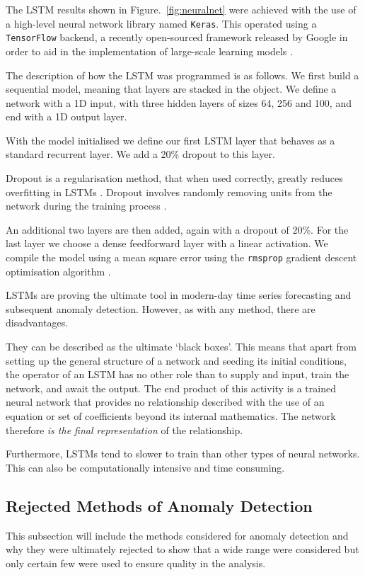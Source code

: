 The LSTM results shown in Figure.~\ref{fig:neuralnet} were achieved with the use of a high-level neural network library named \texttt{Keras}. This operated using a \texttt{TensorFlow} backend, a recently open-sourced framework released by Google in order to aid in the implementation of large-scale learning models \cite{Abadi:2016:TSL:3026877.3026899}.

The description of how the LSTM was programmed is as follows. We first build a sequential model, meaning that layers are stacked in the object.  We define a network with a 1D input, with three hidden layers of sizes 64, 256 and 100, and end with a 1D output layer.

With the model initialised we define our first LSTM layer that behaves as a standard recurrent layer. We add a 20\% dropout to this layer. 

Dropout is a regularisation method, that when used correctly, greatly reduces overfitting in LSTMs \cite{2014arXiv1409.2329Z}. Dropout involves randomly removing units from the network during the training process \cite{2013arXiv1311.0701B}.

An additional two layers are then added, again with a dropout of 20\%. For the last layer we choose a dense feedforward layer with a linear activation. We compile the model using a mean square error using the \texttt{rmsprop} gradient descent optimisation algorithm \cite{krause2016multiplicative}.

LSTMs are proving the ultimate tool in modern-day time series forecasting and subsequent anomaly detection. However, as with any method, there are disadvantages.

They can be described as the ultimate `black boxes'. This means that apart from setting up the general structure of a network and seeding its initial conditions, the operator of an LSTM has no other role than to supply and input, train the network, and await the output. The end product of this activity is a trained neural network that provides no relationship described with the use of an equation or set of coefficients beyond its internal mathematics. The network therefore \emph{is the final representation} of the relationship.

Furthermore, LSTMs tend to slower to train than other types of neural networks. This can also be computationally intensive and time consuming.


\subsection{Rejected Methods of Anomaly Detection}
This subsection will include the methods considered for anomaly detection and why they were ultimately rejected to show that a wide range were considered but only certain few were used to ensure quality in the analysis.
